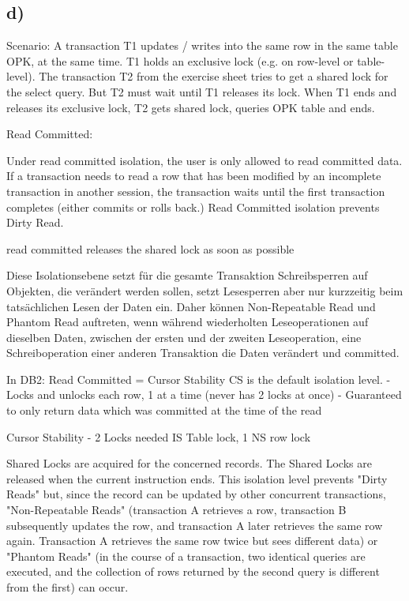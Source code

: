 \documentclass[ngerman]{dis-template-add}
\begin{document}
\subsection*{d)}

Scenario: A transaction T1 updates / writes into the same row in the same table OPK, at the same time. T1 holds an exclusive lock (e.g. on row-level or table-level).
The transaction T2 from the exercise sheet tries to get a shared lock for the select query. But T2 must wait until T1 releases its lock.
When T1 ends and releases its exclusive lock, T2 gets shared lock, queries OPK table and ends.

Read Committed:

Under read committed isolation, the user is only allowed to read committed data.
If a transaction needs to read a row that has been modified by an incomplete transaction in another session, the transaction waits until the first transaction completes (either commits or rolls back.)
Read Committed isolation prevents Dirty Read.

read committed releases the shared lock as soon as possible

Diese Isolationsebene setzt für die gesamte Transaktion Schreibsperren auf Objekten, die verändert werden sollen, setzt Lesesperren aber nur kurzzeitig beim tatsächlichen Lesen der Daten ein. Daher können Non-Repeatable Read und Phantom Read auftreten, wenn während wiederholten Leseoperationen auf dieselben Daten, zwischen der ersten und der zweiten Leseoperation, eine Schreiboperation einer anderen Transaktion die Daten verändert und committed.

In DB2: Read Committed = Cursor Stability
CS is the default isolation level.
- Locks and unlocks each row, 1 at a time (never has 2 locks at once)
- Guaranteed to only return data which was committed at the time of the
read

Cursor Stability - 2 Locks needed
IS Table lock, 1 NS row lock


Shared Locks are acquired for the concerned records.
The Shared Locks are released when the current instruction ends.
This isolation level prevents "Dirty Reads" but, since the record can be updated by other concurrent transactions, "Non-Repeatable Reads" (transaction A retrieves a row, transaction B subsequently updates the row, and transaction A later retrieves the same row again. Transaction A retrieves the same row twice but sees different data) or "Phantom Reads" (in the course of a transaction, two identical queries are executed, and the collection of rows returned by the second query is different from the first) can occur.
\end{document}
